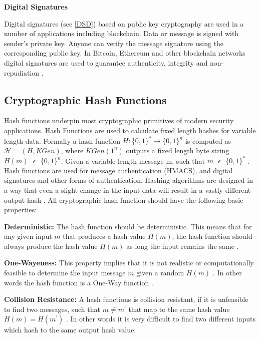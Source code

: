 \textbf{Digital Signatures} 

Digital signatures (see \ref{DSD}) based on public key cryptography are used in a number of applications including blockchain. Data or message is signed with sender’s private key. Anyone can verify the message signature using the corresponding public key. In Bitcoin, Ethereum and other blockchain networks digital signatures are used to guarantee authenticity, integrity and non-repudiation \cite{wiki:004}.
\vspace{0.5cm}
\subsection{Cryptographic Hash Functions}
Hash functions underpin most cryptographic primitives of modern security applications. Hash Functions are used to calculate fixed length hashes for variable length data. Formally a hash function $H:\{0,1\}^* \rightarrow \{0,1\}^n$ is computed as $ \mathcal{H} = (H,KGen) $, where $ KGen(1^n) $ outputs a fixed length byte string $ H(m)  \text{ }\epsilon\text{ } \{0,1\}^n $. Given a variable length message m, such that $m  \text{ }\epsilon\text{ } \{0,1\}^*$ \cite{cryptoeprint:2018:274}. Hash functions are used for message authentication (HMACS), and digital signatures and other forms of authentication. Hashing algorithms are designed in a way that even a slight change in the input data will result in a vastly different output hash \cite{10.1007/978-3-540-25937-4_24}. All cryptographic hash function should have the following basic properties:


\textbf{Deterministic:} The hash function should be deterministic. This means that for any given input $m$ that produces a hash value $H(m)$, the hash function should always produce the hash value $H(m)$ as long the input remains the same \cite{10.1007/978-3-540-25937-4_24}.

\textbf{One-Wayeness:} This property implies that it is not realistic or computationally feasible to determine the input message $m$ given a random $H(m)$ \cite{cryptoeprint:2018:274}. In other words the hash function is a One-Way function \cite{10.1007/978-3-540-25937-4_24}.

\textbf{Collision Resistance:} A hash functions is collision resistant, if it is unfeasible to find two messages, such that $ m \neq m^\prime$ that map to the same hash value $H(m) = {H(m^\prime)}$ \cite{cryptoeprint:2018:274}. In other words it is very difficult to find two different inputs which hash to the same output hash value.
\vspace{0.5cm}
